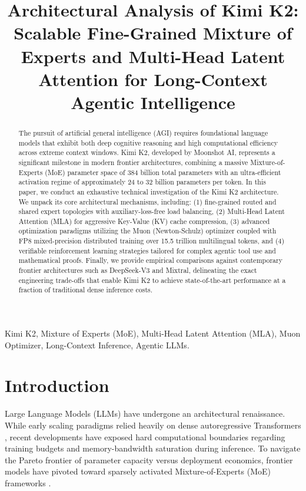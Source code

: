 \documentclass[conference]{IEEEtran}
\begin{document}
\title{Architectural Analysis of Kimi K2: Scalable Fine-Grained Mixture of Experts and Multi-Head Latent Attention for Long-Context Agentic Intelligence}

\maketitle

\begin{abstract}
The pursuit of artificial general intelligence (AGI) requires foundational language models that exhibit both deep cognitive reasoning and high computational efficiency across extreme context windows. Kimi K2, developed by Moonshot AI, represents a significant milestone in modern frontier architectures, combining a massive Mixture-of-Experts (MoE) parameter space of 384 billion total parameters with an ultra-efficient activation regime of approximately 24 to 32 billion parameters per token. In this paper, we conduct an exhaustive technical investigation of the Kimi K2 architecture. We unpack its core architectural mechanisms, including: (1) fine-grained routed and shared expert topologies with auxiliary-loss-free load balancing, (2) Multi-Head Latent Attention (MLA) for aggressive Key-Value (KV) cache compression, (3) advanced optimization paradigms utilizing the Muon (Newton-Schulz) optimizer coupled with FP8 mixed-precision distributed training over 15.5 trillion multilingual tokens, and (4) verifiable reinforcement learning strategies tailored for complex agentic tool use and mathematical proofs. Finally, we provide empirical comparisons against contemporary frontier architectures such as DeepSeek-V3 and Mixtral, delineating the exact engineering trade-offs that enable Kimi K2 to achieve state-of-the-art performance at a fraction of traditional dense inference costs.
\end{abstract}

\begin{IEEEkeywords}
Kimi K2, Mixture of Experts (MoE), Multi-Head Latent Attention (MLA), Muon Optimizer, Long-Context Inference, Agentic LLMs.
\end{IEEEkeywords}

\section{Introduction}
Large Language Models (LLMs) have undergone an architectural renaissance. While early scaling paradigms relied heavily on dense autoregressive Transformers \cite{vaswani2017attention}, recent developments have exposed hard computational boundaries regarding training budgets and memory-bandwidth saturation during inference. To navigate the Pareto frontier of parameter capacity versus deployment economics, frontier models have pivoted toward sparsely activated Mixture-of-Experts (MoE) frameworks \cite{shazeer2017outrageously, fedus2022switch}.
\end{document}
